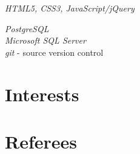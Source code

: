 \documentclass[10pt]{article} %
\begin{document}

{
\textit{HTML5, CSS3, JavaScript/jQuery}\\
}


{
\textit{PostgreSQL}\\
\textit{Microsoft SQL Server}\\
\textit{git} - source version control
}


\section{Interests}



\section{Referees}
\end{document}
